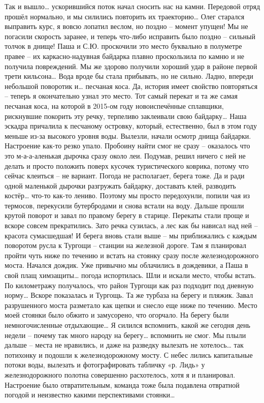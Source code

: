 Так и вышло… ускорившийся поток начал сносить нас на камни. Передовой отряд прошёл нормально, и мы силились повторить их траекторию… Олег старался выправить курс, я вовсю лопатил веслом, но поздно – момент упущен! Мы не погасили скорость заранее, и теперь что-либо исправить было поздно – сильный толчок в днище! Паша и С.Ю. проскочили это место буквально в полуметре правее – их каркасно-надувная байдарка плавно проскользила по камню и не получила повреждений. Мы же здорово получили хороший удар в районе первой трети кильсона… Вода вроде бы стала прибывать, но не сильно. Ладно, впереди небольшой поворотик и… песчаная коса. Да, история имеет свойство повторяться – теперь я окончательно узнал это место. Тот самый перекат и та же самая песчаная коса, на которой в 2015-ом году новоиспечённые сплавщики, рискнувшие покорить эту речку, терпеливо заклеивали свою байдарку… 
Наша эскадра причалила к песчаному островку, который, естественно, был в этом году меньше из-за высокого уровня воды. Вылезли, начали осмотр днища байдарки. Настроение как-то резко упало. Пробоину найти смог не сразу – оказалось что это м-а-а-аленькая дырочка сразу около леи. Подумав, решил ничего с ней не делать и просто положить поверх кусочек туристического коврика, потому что сейчас клеиться – не вариант. Погода не располагает, берега тоже. Да и ради одной маленькой дырочки разгружать байдарку, доставать клей, разводить костёр… что-то как-то лениво. Поэтому мы просто передохунли, попили чая из термосов, перекусили бутербродами и снова встали на воду.
Дальше прошли крутой поворот и завал по правому берегу в старице. Перекаты стали проще и вскоре совсем прекратились. Зато речка сузилась, а лес как бы нависал над ней – красота сумасшедшая! И берега вновь стали выше – мы приближались с каждым поворотом русла к Тургощи – станции на железной дороге. Там я планировал пройти чуть ниже по течению и встать на стоянку сразу после железнодорожного моста. 
Начался дождик. Уже привычно мы облачились в дождевики, а Паша в свой плащ химзащиты… погода испортилась. Шли и искали место, чтобы встать. По километражу получалось, что район Тургощи как раз подходит под дневную норму…
Вскоре показалась и Тургощь. Та же турбаза на берегу и пляжик. Завал разрушенного моста разметало как щепки и снесло еще ниже по течению. Место моей стоянки было обжито и замусорено, что огорчало. На берегу были немногочисленные отдыхающие… Я силился вспомнить, какой же сегодня день недели – почему так много народу на берегу… вспомнить не смог. 
Мы плыли дальше – места не нравились, и даже на разведку вылезать не хотелось… так потихонку и подошли к железнодорожному мосту. С небес лились капитальные потоки воды, вылезать и фотографировать табличку «р. Лидь» у железнодорожного полотна совершенно расхотелось, хотя я и планировал. Настроение было отвратительным, команда тоже была подавлена отвратной погодой и неизвестно какими перспективами стоянки…
